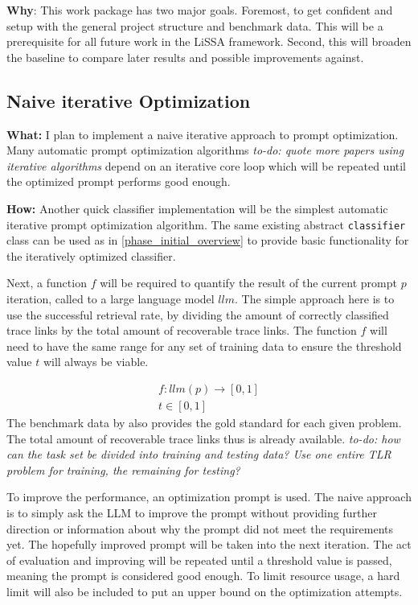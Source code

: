 \textbf{Why}: This work package has two major goals. Foremost, to get confident and setup with the general project structure and benchmark data. This will be a prerequisite for all future work in the LiSSA framework. Second, this will broaden the baseline to compare later results and possible improvements against.


\subsection{Naive iterative Optimization}
\label{phase_naive_iterative}
\textbf{What:} I plan to implement a naive iterative approach to prompt optimization. Many automatic prompt optimization algorithms \cite{pryzant2023AutomaticPrompt} \textit{to-do: quote more papers using iterative algorithms} depend on an iterative core loop which will be repeated until the optimized prompt performs good enough.

\textbf{How:} Another quick classifier implementation will be the simplest automatic iterative prompt optimization algorithm. The same existing abstract \verb|classifier| class can be used as in \ref{phase_initial_overview} to provide basic functionality for the iteratively optimized classifier.

Next, a function $f$ will be required to quantify the result of the current prompt $p$ iteration, called to a large language model $llm$. The simple approach here is to use the successful retrieval rate, by dividing the amount of correctly classified trace links by the total amount of recoverable trace links.
The function $f$ will need to have the same range for any set of training data to ensure the threshold value $t$ will always be viable.


\begin{align*} 
f: llm(p) \rightarrow [0, 1] \\
t \in [0, 1]
\end{align*}
The benchmark data by  also provides the gold standard for each given problem. The total amount of recoverable trace links thus is already available. \textit{to-do: how can the task set be divided into training and testing data? Use one entire TLR problem for training, the remaining for testing?}

To improve the performance, an optimization prompt is used. The naive approach is to simply ask the LLM to improve the prompt without providing further direction or information about why the prompt did not meet the requirements yet. The hopefully improved prompt will be taken into the next iteration. The act of evaluation and improving will be repeated until a threshold value is passed, meaning the prompt is considered good enough. To limit resource usage, a hard limit will also be included to put an upper bound on the optimization attempts.


